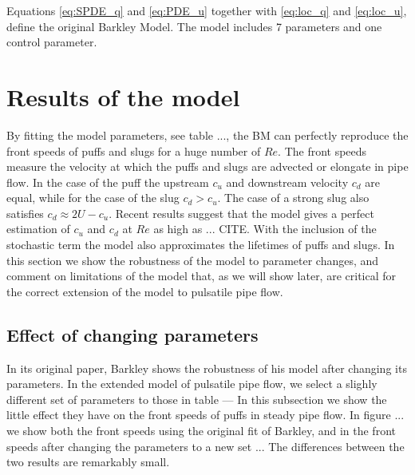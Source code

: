 \documentclass{article}
\begin{document}
Equations \ref{eq:SPDE_q} and \ref{eq:PDE_u} together with \ref{eq:loc_q} and \ref{eq:loc_u}, define the original Barkley Model. The model includes 7 parameters and one control parameter.



\section{Results of the model}
By fitting the model parameters, see table ..., the BM can perfectly reproduce the front speeds of puffs and slugs for a huge number of $Re$. The front speeds measure the velocity at which the puffs and slugs are advected or elongate in pipe flow. In the case of the puff the upstream $c_{u}$ and downstream velocity $c_{d}$ are equal, while for the case of the slug $c_{d}>c_{u}$. The case of a strong slug also satisfies $c_{d}\approx 2U-c_{u}$. Recent results suggest that the model gives a perfect estimation of $c_{u}$ and $c_{d}$ at $Re$ as high as ... CITE. With the inclusion of the stochastic term the model also approximates the lifetimes of puffs and slugs. In this section we show the robustness of the model to parameter changes, and comment on limitations of the model that, as we will show later, are critical for the correct extension of the model to pulsatile pipe flow. 

\subsection{Effect of changing parameters}
In its original paper, Barkley shows the robustness of his model after changing its parameters. In the extended model of pulsatile pipe flow, we select a slighly different set of parameters to those in table --- In this subsection we show the little effect they have on the front speeds of puffs in steady pipe flow. In figure ... we show both the front speeds using the original fit of Barkley, and in the front speeds after changing the parameters to a new set ... The differences between the two results are remarkably small.



\end{document}

